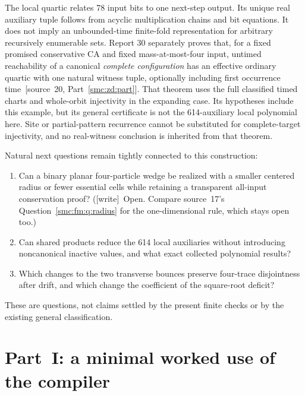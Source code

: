 \documentclass[11pt,letterpaper]{article}
\numberwithin{equation}{section}
\theoremstyle{definition}
\theoremstyle{remark}
\newcommand{\wtag}{\textup{[write]}}
\begin{document}
The local quartic relates 78 input bits to one next-step output. Its unique real auxiliary tuple follows from acyclic multiplication chains and bit equations. It does not imply an unbounded-time finite-fold representation for arbitrary recursively enumerable sets. Report 30 separately proves that, for a fixed promised conservative CA and fixed mass-at-most-four input, untimed reachability of a canonical \emph{complete configuration} has an effective ordinary quartic with one natural witness tuple, optionally including first occurrence time~\textup{[source~20, Part~\ref{smc:zd:part}]}. That theorem uses the full classified timed charts and whole-orbit injectivity in the expanding case. Its hypotheses include this example, but its general certificate is not the 614-auxiliary local polynomial here. Site or partial-pattern recurrence cannot be substituted for complete-target injectivity, and no real-witness conclusion is inherited from that theorem.

Natural next questions remain tightly connected to this construction:
\begin{enumerate}
\item\label{smc:bp:q:radius} Can a binary planar four-particle wedge be realized with a smaller centered radius or fewer essential cells while retaining a transparent all-input conservation proof? (\wtag\ Open. Compare source~17's Question~\ref{smc:fm:q:radius} for the one-dimensional rule, which stays open too.)
\item\label{smc:bp:q:shared} Can shared products reduce the 614 local auxiliaries without introducing noncanonical inactive values, and what exact collected polynomial results?
\item\label{smc:bp:q:bounces} Which changes to the two transverse bounces preserve four-trace disjointness after drift, and which change the coefficient of the square-root deficit?
\end{enumerate}
These are questions, not claims settled by the present finite checks or by the existing general classification.


\appendix
\section{Part~I: a minimal worked use of the compiler}
\label{smc:cg:app:example}
\end{document}
